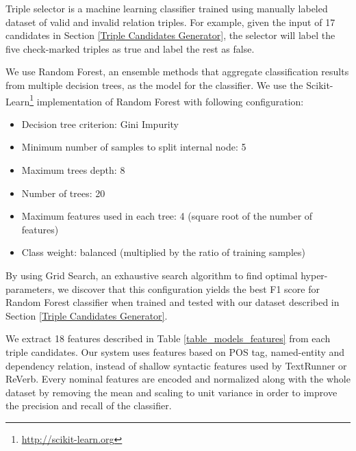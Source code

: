 \documentclass[conference,compsoc]{IEEEtran}
\begin{document}
Triple selector is a machine learning classifier trained using manually labeled dataset of valid and invalid relation triples. For example, given the input of 17 candidates in Section \ref{Triple Candidates Generator}, the selector will label the five check-marked triples as true and label the rest as false.

We use Random Forest\cite{breiman2001random}, an ensemble methods that aggregate classification results from multiple decision trees, as the model for the classifier. We use the Scikit-Learn\footnote{\url{http://scikit-learn.org}} implementation of Random Forest with following configuration:

\begin{itemize}
\item Decision tree criterion: Gini Impurity
\item Minimum number of samples to split internal node: 5
\item Maximum trees depth: 8
\item Number of trees: 20
\item Maximum features used in each tree: 4 (square root of the number of features)
\item Class weight: balanced (multiplied by the ratio of training samples)
\end{itemize}

By using Grid Search\cite{wasserman2015grid}, an exhaustive search algorithm to find optimal hyper-parameters, we discover that this configuration yields the best F1 score for Random Forest classifier when trained and tested with our dataset described in Section \ref{Triple Candidates Generator}. 

We extract 18 features described in Table \ref{table_models_features} from each triple candidates. Our system uses features based on POS tag, named-entity and dependency relation, instead of shallow syntactic features used by TextRunner or ReVerb\cite{banko2007open}\cite{etzioni2011open}. Every nominal features are encoded and normalized along with the whole dataset by removing the mean and scaling to unit variance in order to improve the precision and recall of the classifier.
\end{document}
